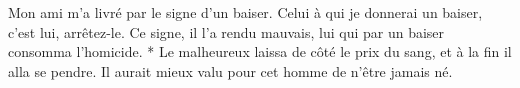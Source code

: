 Mon ami m’a livré par le signe d’un baiser.
Celui à qui je donnerai un baiser, c’est lui, arrêtez-le.
Ce signe, il l’a rendu mauvais,
lui qui par un baiser consomma l’homicide.
* Le malheureux laissa de côté le prix du sang,
et à la fin il alla se pendre.
\versseparator
Il aurait mieux valu pour cet homme de n’être jamais né.